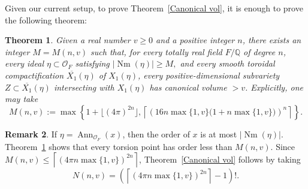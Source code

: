\documentclass[12 pt]{amsart}
\newtheorem{theorem}{Theorem}[section]
\theoremstyle{definition}
\newtheorem{Remark}[theorem]{Remark}
\newcommand{\Xb}{\overline{X_{1}}}
\newcommand{\Nm}{\operatorname{Nm}}
\begin{document}
Given our current setup, to prove Theorem~\ref{Canonical vol}, it is enough to prove the following theorem:

\begin{theorem}\label{Main}
Given a real number $v\ge 0$ and a positive integer $n$, there exists an
integer $M=M(n,v)$ such that, for every totally real
field \(F/\mathbb Q\) of degree \(n\), every ideal
\(\eta\subset\mathcal O_F\) satisfying
\(
|\Nm(\eta)|\geq M,
\) and every smooth toroidal compactification
$\Xb(\eta)$ of $X_1(\eta)$, every positive-dimensional subvariety
$Z\subset\Xb(\eta)$ intersecting with $X_1(\eta)$ has canonical volume
$>v$. Explicitly, one may take
\[
M(n,v):=\max\left\{1+\lfloor(4\pi)^{2n}\rfloor,
\left\lceil\left(16n\max\{1,v\}
\bigl(1+n\max\{1,v\}\bigr)\right)^n\right\rceil\right\}.
\]
\end{theorem}

\begin{Remark}\label{explicit N} If $\eta=\operatorname{Ann}_{\mathcal O_F}(x)$, then the order of $x$ is at most $|\Nm(\eta)|$. Theorem~\ref{Main} shows that every torsion point has order less than $M(n,v).$
Since
\(
M(n,v)\le
\left\lceil
\left(4\pi n\max\{1,v\}\right)^{2n}
\right\rceil
\), 
Theorem~\ref{Canonical vol} follows by taking
\[
N(n,v)=
\left(
\left\lceil
\left(4\pi n\max\{1,v\}\right)^{2n}
\right\rceil-1
\right)!.
\]
\end{Remark}
\end{document}
